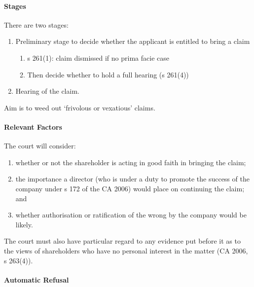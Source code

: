 \documentclass[
]{article}
\providecommand{\tightlist}{%
  \setlength{\itemsep}{0pt}\setlength{\parskip}{0pt}}
\begin{document}
\hypertarget{stages}{%
\paragraph{Stages}\label{stages}}

There are two stages:

\begin{enumerate}
\def\labelenumi{\arabic{enumi}.}
\tightlist
\item
  Preliminary stage to decide whether the applicant is entitled to bring
  a claim

  \begin{enumerate}
  \def\labelenumii{\arabic{enumii}.}
  \tightlist
  \item
    s 261(1): claim dismissed if no prima facie case
  \item
    Then decide whether to hold a full hearing (s 261(4))
  \end{enumerate}
\item
  Hearing of the claim.
\end{enumerate}

Aim is to weed out `frivolous or vexatious' claims.

\hypertarget{relevant-factors}{%
\paragraph{Relevant Factors}\label{relevant-factors}}

The court will consider:

\begin{enumerate}
\def\labelenumi{\arabic{enumi}.}
\tightlist
\item
  whether or not the shareholder is acting in good faith in bringing the
  claim;
\item
  the importance a director (who is under a duty to promote the success
  of the company under s 172 of the CA 2006) would place on continuing
  the claim; and
\item
  whether authorisation or ratification of the wrong by the company
  would be likely.
\end{enumerate}

The court must also have particular regard to any evidence put before it
as to the views of shareholders who have no personal interest in the
matter (CA 2006, s 263(4)).

\hypertarget{automatic-refusal}{%
\paragraph{Automatic Refusal}\label{automatic-refusal}}
\end{document}
